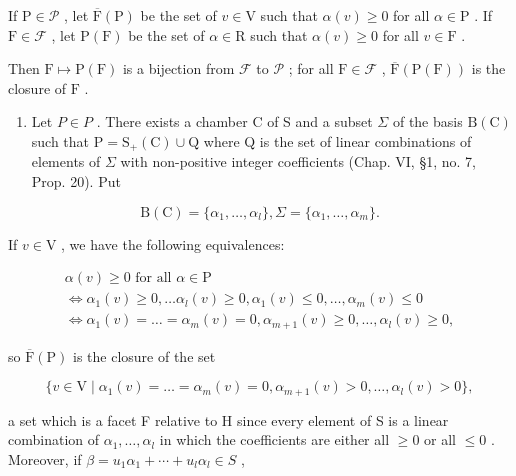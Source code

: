 If \(\mathrm{P} \in \mathcal{P}\) , let \(\overline{\mathrm{F}}(\mathrm{P})\) be the set of \(v \in \mathrm{V}\) such that \(\alpha(v) \geq 0\) for all \(\alpha \in \mathrm{P}\) . If \(\mathrm{F} \in \mathcal{F}\) , let \(\mathrm{P}(\mathrm{F})\) be the set of \(\alpha \in \mathrm{R}\) such that \(\alpha(v) \geq 0\) for all \(v \in \mathrm{F}\) .

Then \(\mathrm{F} \mapsto \mathrm{P}(\mathrm{F})\) is a bijection from \(\mathcal{F}\) to \(\mathcal{P}\) ; for all \(\mathrm{F} \in \mathcal{F}\) , \(\overline{\mathrm{F}}(\mathrm{P}(\mathrm{F}))\) is the closure of \(\mathrm{F}\) .

\begin{enumerate}
\def\labelenumi{\alph{enumi})}
\tightlist
\item
  Let \(P \in P\) . There exists a chamber C of S and a subset \(\Sigma\) of the basis \(\mathrm{B}(\mathrm{C})\) such that \(\mathrm{P} = \mathrm{S}_{+}(\mathrm{C}) \cup \mathrm{Q}\) where Q is the set of linear combinations of elements of \(\Sigma\) with non-positive integer coefficients (Chap. VI, §1, no. 7, Prop. 20). Put
\end{enumerate}

\[
\mathrm{B} (\mathrm{C}) = \{\alpha_ {1}, \dots , \alpha_ {l} \}, \Sigma = \{\alpha_ {1}, \dots , \alpha_ {m} \}.
\]

If \(v \in \mathrm{V}\) , we have the following equivalences:

\[
\begin{array}{c} \alpha (v) \geq 0 \text {   for   all   } \alpha \in \mathrm{P} \\ \Longleftrightarrow \alpha_ {1} (v) \geq 0, \ldots \alpha_ {l} (v) \geq 0, \alpha_ {1} (v) \leq 0, \ldots , \alpha_ {m} (v) \leq 0 \\ \Longleftrightarrow \alpha_ {1} (v) = \dots = \alpha_ {m} (v) = 0, \alpha_ {m + 1} (v) \geq 0, \ldots , \alpha_ {l} (v) \geq 0, \end{array}
\]

so \(\overline{\mathrm{F}}(\mathrm{P})\) is the closure of the set

\[
\{v \in \mathrm{V} \mid \alpha_ {1} (v) = \dots = \alpha_ {m} (v) = 0, \alpha_ {m + 1} (v) > 0, \dots , \alpha_ {l} (v) > 0 \},
\]

a set which is a facet F relative to H since every element of S is a linear combination of \(\alpha_{1},\ldots,\alpha_{l}\) in which the coefficients are either all \(\geq0\) or all \(\leq0\) . Moreover, if \(\beta=u_{1}\alpha_{1}+\cdots+u_{l}\alpha_{l}\in S\) ,

